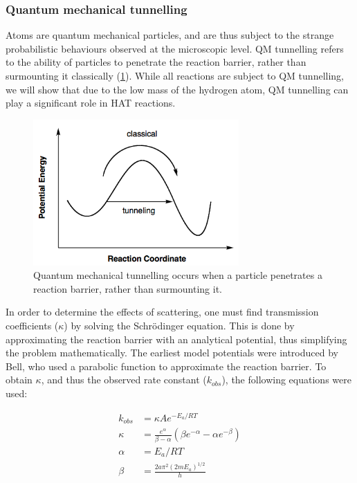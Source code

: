 \subsubsection{Quantum mechanical tunnelling}

Atoms are quantum mechanical particles, and are thus subject to the strange probabilistic behaviours observed at the microscopic level. QM tunnelling refers to the ability of particles to penetrate the reaction barrier, rather than surmounting it classically (\ref{fig:tunnelling}). While all reactions are subject to QM tunnelling, we will show that due to the low mass of the hydrogen atom, QM tunnelling can play a significant role in HAT reactions.

\begin{figure}[htb]
  \centering
  \includegraphics[width=0.7\textwidth]{figures/tunnelling}
  \caption{Quantum mechanical tunnelling occurs when a particle penetrates a
    reaction barrier, rather than surmounting it. }
  \label{fig:tunnelling}
\end{figure}


In order to determine the effects of scattering, one must find transmission coefficients ($\kappa$) by solving the Schr{\"o}dinger equation. This is done by approximating the reaction barrier with an analytical potential, thus simplifying the problem mathematically. The earliest model potentials were introduced by Bell, who used a parabolic function to approximate the reaction barrier.\cite{Bell1980} To obtain $\kappa$, and thus the observed rate constant ($k_{obs}$), the following equations were used:

\begin{align}
  k_{obs} &= \kappa A e^{-E_a/RT}  \\
\kappa &= \frac{e^\alpha}{\beta-\alpha} \left(\beta e^{-\alpha} - \alpha
  e^{-\beta} \right) \\
  \alpha &= E_a/RT \\
  \beta &= \frac{2a\pi^2(2mE_a)^{1/2}}{h}
\end{align}

